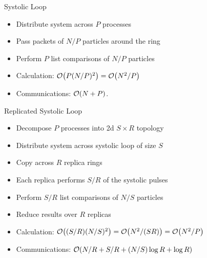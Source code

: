 \documentclass[xcolor={usenames, svgnames}]{beamer}
\begin{document}
\begin{frame}{Systolic Loop}
    \begin{center}
        \resizebox{0.5\textwidth}{!}{
            \slpic{}
        }
    \end{center}

    \begin{itemize}
        \item Distribute system across $P$ processes
        \item Pass packets of $N/P$ particles around the ring
        \item Perform $P$ list comparisons of $N/P$ particles
        \item Calculation: $\mathcal{O}{\left({ P(N/P)^2 }\right)} = \mathcal{O}{\left({ N^2/P }\right)}$
        \item Communications: $\mathcal{O}{\left({ N + P }\right)}$.
    \end{itemize}
\end{frame}

\begin{frame}{Replicated Systolic Loop}
    \begin{center}
        \begin{minipage}{0.3\textwidth}
                \resizebox{\textwidth}{!}{
                    \slpic{}
                }
        \end{minipage}%
        \begin{minipage}{0.3\textwidth}
                \resizebox{\textwidth}{!}{
                    \slpic{}
                }
        \end{minipage}%
        \begin{minipage}{0.3\textwidth}
                \resizebox{\textwidth}{!}{
                    \slpic{}
                }
        \end{minipage}
    \end{center}

    \begin{itemize}
        \item Decompose $P$ processes into 2d $S\times{}R$ topology
        \item Distribute system across systolic loop of size $S$
        \item Copy across $R$ replica rings
        \item Each replica performs $S/R$ of the systolic pulses
        \item Perform $S/R$ list comparisons of $N/S$ particles
        \item Reduce results over $R$ replicas
        \item Calculation:
            $\mathcal{O}{\left({ (S/R)(N/S)^2 }\right)} = \mathcal{O}{\left({ N^2/(SR) }\right)} = \mathcal{O}{\left({ N^2/P }\right)}$
        \item Communications: $\mathcal{O}{\left({ N/R + S/R + (N/S)\log{R} + \log{R} }\right)}$
    \end{itemize}
\end{frame}
\end{document}
